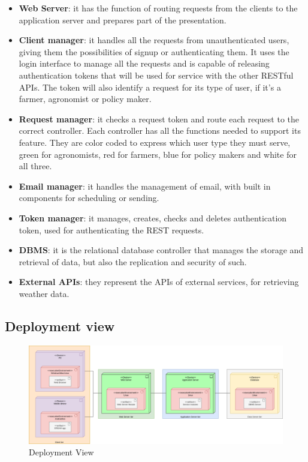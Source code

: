\documentclass{article}
\begin{document}
    \begin{itemize}
        \item \textbf{Web Server}: it has the function of routing requests from the clients to the application server and prepares part of the presentation.
        
        \item \textbf{Client manager}: it handles all the requests from unauthenticated users, giving them the possibilities of signup or authenticating them. It uses the login interface to manage all the requests and is capable of releasing authentication tokens that will be used for service with the other RESTful APIs. The token will also identify a request for its type of user, if it’s a farmer, agronomist or policy maker.
        
        \item \textbf{Request manager}: it checks a request token and route each request to the correct controller. Each controller has all the functions needed to support its feature. They are color coded to express which user type they must serve, green for agronomists, red for farmers, blue for policy makers and white for all three.
        
        \item \textbf{Email manager}: it handles the management of email, with built in components for scheduling or sending.
        
        \item \textbf{Token manager}: it manages, creates, checks and deletes authentication token, used for authenticating the REST requests.
        
        \item \textbf{DBMS}: it is the relational database controller that manages the storage and retrieval of data, but also the replication and security of such.
        
        \item \textbf{External APIs}: they represent the APIs of external services, for retrieving weather data.
        
    \end{itemize}
    

\newpage

\subsection{Deployment view}

    \begin{figure} [h]
        \centering
        \includegraphics[width=1\textwidth]{images/ArchitecturalDesign/DeploymentView.png}
        \caption{\label{fig:DeploymentView}Deployment View}
    \end{figure}
    
\end{document}
